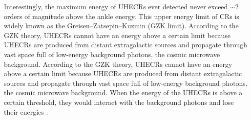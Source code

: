 Interestingly, the maximum energy of UHECRs ever detected never
exceed $\sim$2 orders of magnitude above the ankle energy.
This upper energy limit of CRs is widely known as the
Greisen–Zatsepin–Kuzmin (GZK limit).
According to the GZK theory, UHECRs cannot have an energy above
a certain limit because UHECRs are produced from distant
extragalactic sources and propagate through vast space full
of low-energy background photons, the cosmic microwave background. 
According to the GZK theory, UHECRs cannot have an energy above
a certain limit because UHECRs are produced from distant
extragalactic sources and propagate through vast space full
of low-energy background photons, the cosmic microwave background. 
When the energy of the UHECRs is above a certain threshold,
they would interact with the background photons and lose their
energies \citep{gzk_cr_limit}. 




